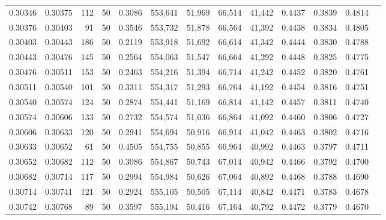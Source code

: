 \begin{tabular}{rrrrrrrrrrrrr}
0.30346 & 0.30375 &   112 &  50 &                                     0.3086 & 553,641 &  51,969 &  66,514 &  41,442 & 0.4437 & 0.3839 & 0.4814 \\
0.30376 & 0.30403 &    91 &  50 &                                     0.3546 & 553,732 &  51,878 &  66,564 &  41,392 & 0.4438 & 0.3834 & 0.4805 \\
0.30403 & 0.30443 &   186 &  50 &                                     0.2119 & 553,918 &  51,692 &  66,614 &  41,342 & 0.4444 & 0.3830 & 0.4788 \\
0.30443 & 0.30476 &   145 &  50 &                                     0.2564 & 554,063 &  51,547 &  66,664 &  41,292 & 0.4448 & 0.3825 & 0.4775 \\
0.30476 & 0.30511 &   153 &  50 &                                     0.2463 & 554,216 &  51,394 &  66,714 &  41,242 & 0.4452 & 0.3820 & 0.4761 \\
0.30511 & 0.30540 &   101 &  50 &                                     0.3311 & 554,317 &  51,293 &  66,764 &  41,192 & 0.4454 & 0.3816 & 0.4751 \\
0.30540 & 0.30574 &   124 &  50 &                                     0.2874 & 554,441 &  51,169 &  66,814 &  41,142 & 0.4457 & 0.3811 & 0.4740 \\
0.30574 & 0.30606 &   133 &  50 &                                     0.2732 & 554,574 &  51,036 &  66,864 &  41,092 & 0.4460 & 0.3806 & 0.4727 \\
0.30606 & 0.30633 &   120 &  50 &                                     0.2941 & 554,694 &  50,916 &  66,914 &  41,042 & 0.4463 & 0.3802 & 0.4716 \\
0.30633 & 0.30652 &    61 &  50 &                                     0.4505 & 554,755 &  50,855 &  66,964 &  40,992 & 0.4463 & 0.3797 & 0.4711 \\
0.30652 & 0.30682 &   112 &  50 &                                     0.3086 & 554,867 &  50,743 &  67,014 &  40,942 & 0.4466 & 0.3792 & 0.4700 \\
0.30682 & 0.30714 &   117 &  50 &                                     0.2994 & 554,984 &  50,626 &  67,064 &  40,892 & 0.4468 & 0.3788 & 0.4690 \\
0.30714 & 0.30741 &   121 &  50 &                                     0.2924 & 555,105 &  50,505 &  67,114 &  40,842 & 0.4471 & 0.3783 & 0.4678 \\
0.30742 & 0.30768 &    89 &  50 &                                     0.3597 & 555,194 &  50,416 &  67,164 &  40,792 & 0.4472 & 0.3779 & 0.4670 \\

\end{tabular}
